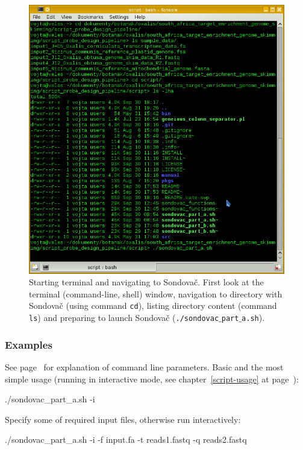 \documentclass[a4paper, 11pt, twoside]{article}
\begin{document}
\begin{figure}[htbp]
\includegraphics[width=\textwidth]{terminal.png}
\caption[Starting terminal and navigating to Sondovač]{Starting terminal and navigating to Sondovač. First look at the terminal (command-line, shell) window, navigation to directory with Sondovač (using command \texttt{cd}), listing directory content (command \texttt{ls}) and preparing to launch Sondovač (\texttt{./sondovac$\_$part$\_$a.sh}).}
\label{terminal}
\end{figure}

\subsubsection{Examples}

See page~\pageref{script-usage} for explanation of command line parameters. Basic and the most simple usage (running in interactive mode, see chapter~\ref{script-usage} at page~\pageref{script-usage}):

\begin{bashcode}
  ./sondovac_part_a.sh -i
\end{bashcode}

Specify some of required input files, otherwise run interactively:

\begin{bashcode}
  ./sondovac_part_a.sh -i -f input.fa -t reads1.fastq -q reads2.fastq
\end{bashcode}
\end{document}
